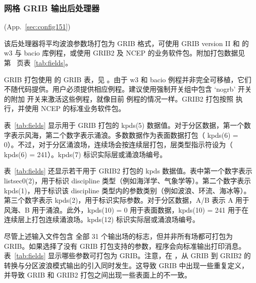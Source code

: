 \vsssub
\subsubsection{网格 GRIB 输出后处理器} \label{sec:ww3grib}
\vsssub

 (App.~\ref{sec:config151})

\vspace{\baselineskip} 
\noindent
该后处理器将平均波浪参数场打包为 GRIB 格式，可使用 GRIB version II 和 \ncep{} 的 w3 与 bacio 库例程，或使用 GRIB2 及 NCEP 的业务软件包。附加打包数据见第~\pageref{tab:fields} 页表~\ref{tab:fields}。

GRIB 打包使用 \ncep{} 的 GRIB 表，见 \cite{rep:GRIB1}。由于 w3 和 bacio 例程并非完全可移植，它们不随代码提供。用户必须提供相应例程。建议使用强制开关组中包含 `{\F nogrb}' 开关的附加 \ws{} 开关来激活这些例程，就像目前 \ncep{} 例程的情况一样。GRIB2 打包按照 \cite{rep:GRIB2} 执行，并使用 NCEP 的标准业务软件包。

表~\ref{tab:fields} 显示用于 GRIB 打包的 {\F kpds(5)} 数据值。对于分区数据，第一个数字表示风海，第二个数字表示涌浪。多数数据作为表面数据打包（{\F
kpds(6) = 0}）。不过，对于分区涌浪场，连续场会按连续层打包，层类型指示符设为（{\F
kpds(6) = 241}）。{\F kpds(7)} 标识实际层或涌浪场编号。

表~\ref{tab:fields} 还显示若干用于 GRIB2 打包的 {\F kpds} 数据值。表中第一个数字表示 {\F listsec0(2)}，用于标识 discipline 类型（例如海洋学、气象学等）。第二个数字表示 {\F kpds(1)}，用于标识该 discipline 类型内的参数类别（例如波浪、环流、海冰等）。第三个数字表示 {\F kpds(2)}，用于标识实际参数。对于分区数据，A/B 表示 A 用于风海、B 用于涌浪。此外，{\F kpds(10) = 0} 用于表面数据，{\F kpds(10) = 241 } 用于在连续层上打包连续涌浪场。{\F kpds(12)} 标识实际层或涌浪场编号。

尽管上述输入文件包含 \ws{} 全部 31 个输出场的标志，但并非所有场都可打包为 GRIB。如果选择了没有 GRIB 打包支持的参数，程序会向标准输出打印消息。表~\ref{tab:fields} 显示哪些参数可打包为 GRIB。注意，在 \ncep{}，从 GRIB 到 GRIB2 的转换与分区波浪模式输出的引入同时发生。这导致 GRIB 中出现一些重复定义，并导致 GRIB 和 GRIB2 打包之间出现一些表面上的不一致。

\pb
